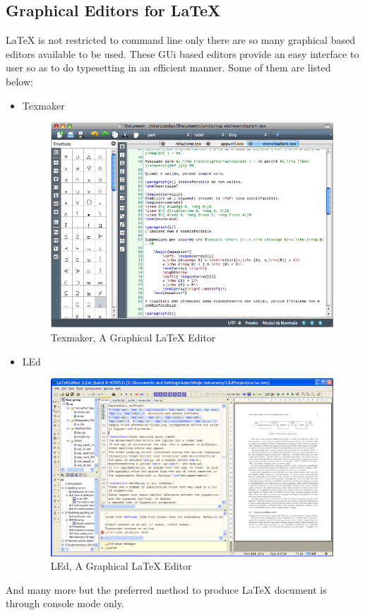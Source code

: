 \subsection{Graphical Editors for \LaTeX{}}
\LaTeX{} is not restricted to command line only there are so many graphical based editors available to be used. These GUi based editors provide an easy interface to user so as to do typesetting in an efficient manner. Some of them are listed below:
\begin{itemize}
\item {Texmaker}
\begin{figure}[ht]
\centering
\includegraphics[scale=0.4]{images/texmaker.png}
\caption{Texmaker, A Graphical \LaTeX{} Editor}
\end{figure}
\item LEd
\begin{figure}[ht]
\centering
\includegraphics[scale=0.5]{images/led.png}
\caption{LEd, A Graphical \LaTeX{} Editor}
\end{figure}
\end{itemize}
And many more but the preferred method to produce \LaTeX{} document is through console mode only.



